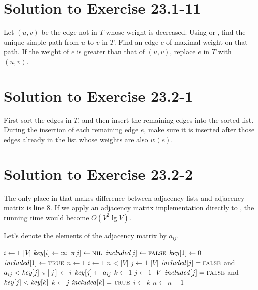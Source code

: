 \documentclass[a4paper, fleqn]{article}
\begin{document}
\section*{Solution to Exercise 23.1-11}

Let $(u, v)$ be the edge not in $T$ whose weight is decreased. Using  or , find the unique simple path from $u$ to $v$ in $T$. Find an edge $e$ of maximal weight on that path. If the weight of $e$ is greater than that of $(u, v)$, replace $e$ in $T$ with $(u, v)$.


\section*{Solution to Exercise 23.2-1}

First sort the edges in $T$, and then insert the remaining edges into the sorted list. During the insertion of each remaining edge $e$, make sure it is inserted after those edges already in the list whose weights are also $w(e)$.


\section*{Solution to Exercise 23.2-2}

The only place in  that makes difference between adjacency lists and adjacency matrix is line 8. If we apply an adjacency matrix implementation directly to , the running time would become $O(V^2 \lg V)$.

Let's denote the elements of the adjacency matrix by $a_{ij}$.

\begin{codebox}
\li \For $i \gets 1$ \To $|V|$
\li   \Do
        $\id{key}[i] \gets \infty$
\li     $\pi[i] \gets \textnormal{\scshape nil}$
\li     $\id{included}[i] \gets \const{false}$
      \End
\li $\id{key}[1] \gets 0$
\li $\id{included}[1] \gets \const{true}$
\li $n \gets 1$
\li $i \gets 1$
\li \While $n < |V|$
\li   \Do
        \For $j \gets 1$ \To $|V|$
\li       \Do
            \If $\id{included}[j] = \const{false}$ and $a_{ij} < \id{key}[j]$
\li           \Then
                $\pi[j] \gets i$
\li             $\id{key}[j] \gets a_{ij}$
              \End
          \End
\li   $k \gets 1$
\li     \For $j \gets 1$ \To $|V|$
\li       \Do
            \If $\id{included}[j] = \const{false}$ and $\id{key}[j] < \id{key}[k]$
\li           \Then
                $k \gets j$
              \End
          \End
\li     $\id{included}[k] = \const{true}$
\li     $i \gets k$
\li     $n \gets n + 1$
      \End
\end{codebox}
\end{document}
